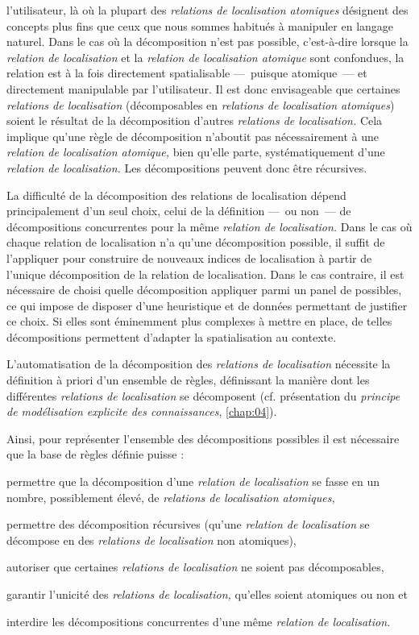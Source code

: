 l'utilisateur, là où la plupart des \emph{relations de localisation
  atomiques} désignent des concepts plus fins que ceux que nous sommes
habitués à manipuler en langage naturel. Dans le cas où la
décomposition n'est pas possible, c'est-à-dire lorsque la
\emph{relation de localisation} et la \emph{relation de localisation
  atomique} sont confondues, la relation est à la fois directement
spatialisable ---~puisque atomique~--- et directement manipulable par
l'utilisateur. Il est donc envisageable que certaines \emph{relations
  de localisation} (décomposables en \emph{relations de localisation
  atomiques}) soient le résultat de la décomposition d'autres
\emph{relations de localisation.} Cela implique qu'une règle de
décomposition n’aboutit pas nécessairement à une \emph{relation de
  localisation atomique,} bien qu'elle parte, systématiquement d'une
\emph{relation de localisation.} Les décompositions peuvent donc être
récursives.

La difficulté de la décomposition des relations de localisation dépend
principalement d'un seul choix, celui de la définition ---~ou non~---
de décompositions concurrentes pour la même \emph{relation de
  localisation.} Dans le cas où chaque relation de localisation n'a
qu'une décomposition possible, il suffit de l'appliquer pour
construire de nouveaux indices de localisation à partir de l'unique
décomposition de la relation de localisation. Dans le cas contraire,
il est nécessaire de choisi quelle décomposition appliquer parmi un
panel de possibles, ce qui impose de disposer d'une heuristique et de
données permettant de justifier ce choix. Si elles sont éminemment
plus complexes à mettre en place, de telles décompositions permettent
d’adapter la spatialisation au contexte.


L'automatisation de la décomposition des \emph{relations de
  localisation} nécessite la définition à priori d'un ensemble de
règles, définissant la manière dont les différentes \emph{relations de
  localisation} se décomposent (cf. présentation du \emph{principe de
  modélisation explicite des connaissances}, \autoref{chap:04}). 

Ainsi, pour représenter l'ensemble des décompositions possibles il est
nécessaire que la base de règles définie puisse :
\begin{enumerate*}[label=(\arabic*)]
\item permettre que la décomposition d'une \emph{relation de
    localisation} se fasse en un nombre, possiblement élevé, de
  \emph{relations de localisation atomiques,}
\item permettre des décomposition récursives (\ie qu'une
  \emph{relation de localisation} se décompose en des \emph{relations
    de localisation} non atomiques),
\item autoriser que certaines \emph{relations de localisation} ne soient pas
  décomposables,
\item garantir l'unicité des \emph{relations de localisation,}
  qu'elles soient atomiques ou non et
\item interdire les décompositions concurrentes d'une même
  \emph{relation de localisation.}
\end{enumerate*}


